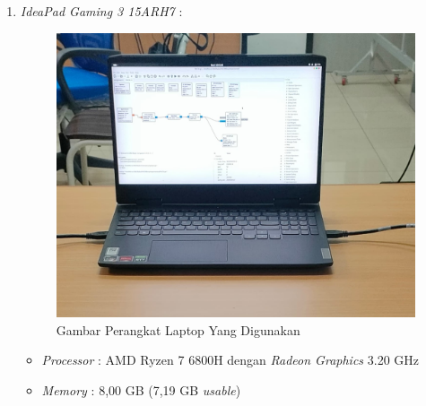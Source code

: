 \begin{enumerate}
	\item \textit{IdeaPad Gaming 3 15ARH7} :
	\begin{figure}
		\begin{center}
			\includegraphics[scale=0.2]{pics/bab3/laptop.jpg} 
			\caption[Gambar Perangkat Laptop Yang Digunakan]{Gambar Perangkat Laptop Yang Digunakan}
			\label{pic:contohBlokGRC}
		\end{center}
	\end{figure}

	\begin{itemize}
		\item \textit{Processor} : AMD Ryzen 7 6800H dengan \textit{Radeon Graphics} 3.20 GHz
		\item \textit{Memory} : 8,00 GB (7,19 GB \textit{usable})
	\end{itemize}


\end{enumerate}
